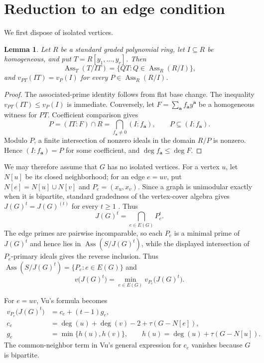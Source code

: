 \documentclass[11pt]{amsart}
\newtheorem{lemma}[theorem]{Lemma}
\DeclareMathOperator{\Ass}{Ass}
\begin{document}
\section{Reduction to an edge condition}

We first dispose of isolated vertices.

\begin{lemma}\label{lem:variables}
Let $R$ be a standard graded polynomial ring, let $I\subseteq R$ be homogeneous,
and put $T=R[y_1,\ldots,y_r]$. Then
\[
  \Ass_T(T/IT)=\{QT:Q\in\Ass_R(R/I)\},
\]
and $v_{PT}(IT)=v_P(I)$ for every $P\in\Ass_R(R/I)$.
\end{lemma}

\begin{proof}
The associated-prime identity follows from flat base change. The inequality
$v_{PT}(IT)\leq v_P(I)$ is immediate. Conversely, let
$F=\sum_{\mathbf a}f_{\mathbf a}y^{\mathbf a}$ be a homogeneous witness for
$PT$. Coefficient comparison gives
\[
  P=(IT:F)\cap R=\bigcap_{f_{\mathbf a}\neq0}(I:f_{\mathbf a}),
  \qquad P\subseteq(I:f_{\mathbf a}).
\]
Modulo $P$, a finite intersection of nonzero ideals in the domain $R/P$ is
nonzero. Hence $(I:f_{\mathbf a})=P$ for some coefficient, and
$\deg f_{\mathbf a}\leq\deg F$.
\end{proof}

We may therefore assume that $G$ has no isolated vertices. For a vertex $u$,
let $N[u]$ be its closed neighborhood; for an edge $e=uv$, put
$N[e]=N[u]\cup N[v]$ and $P_e=(x_u,x_v)$. Since a graph is unimodular exactly
when it is bipartite, standard gradedness of the vertex-cover algebra gives
$J(G)^t=J(G)^{(t)}$ for every $t\geq1$ \cite[Theorem~1.1]{HHT}. Thus
\[
  J(G)^t=\bigcap_{e\in E(G)}P_e^t.
\]
The edge primes are pairwise incomparable, so each $P_e$ is a minimal prime of
$J(G)^t$ and hence lies in $\Ass(S/J(G)^t)$, while the displayed intersection of
$P_e$-primary ideals gives the reverse inclusion. Thus
$\Ass(S/J(G)^t)=\{P_e:e\in E(G)\}$ and
\[
  v\bigl(J(G)^t\bigr)=\min_{e\in E(G)}v_{P_e}\bigl(J(G)^t\bigr).
\]

For $e=uv$, Vu's formula \cite[Theorem~1.3 and Lemmas~2.5--2.6]{Vu} becomes
\begin{align}
  v_{P_e}\bigl(J(G)^t\bigr)&=c_e+(t-1)g_e, \label{eq:local}\\
  c_e&=\deg(u)+\deg(v)-2+\tau(G-N[e]), \label{eq:c}\\
  g_e&=\min\{h(u),h(v)\},\qquad h(u)=\deg(u)+\tau(G-N[u]). \label{eq:g}
\end{align}
The common-neighbor term in Vu's general expression for $c_e$ vanishes because
$G$ is bipartite.
\end{document}
